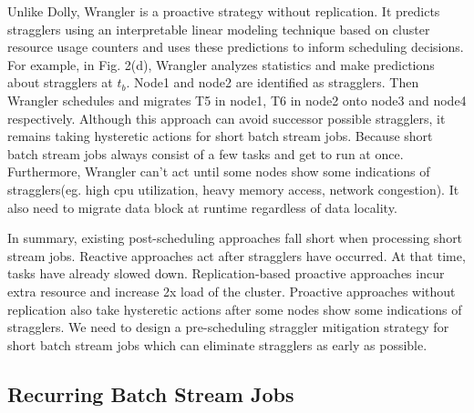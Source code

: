 \documentclass[10pt,conference,compsocconf,letterpaper]{IEEEtran}
\begin{document}
  Unlike Dolly, Wrangler \cite{Yadwadkar2014} is a proactive strategy without replication. It predicts stragglers using an interpretable linear modeling technique based on cluster resource usage counters and uses these predictions to inform scheduling decisions. For example, in Fig. 2(d), Wrangler analyzes statistics and make predictions about stragglers at $t_b$. Node1 and node2 are identified as stragglers. Then Wrangler schedules and migrates T5 in node1, T6 in node2 onto node3 and node4 respectively. Although this approach can avoid successor possible stragglers, it remains taking hysteretic actions for short batch stream jobs. Because short batch stream jobs always consist of a few tasks and get to run at once. Furthermore, Wrangler can't act until some nodes show some indications of stragglers(eg. high cpu utilization, heavy memory access, network congestion). It also need to migrate data block at runtime regardless of data locality.

  In summary, existing post-scheduling approaches fall short when processing short stream jobs. Reactive approaches act after stragglers have occurred. At that time, tasks have already slowed down. Replication-based proactive approaches incur extra resource and increase 2x load of the cluster. Proactive approaches without replication also take hysteretic actions after some nodes show some indications of stragglers. We need to design a pre-scheduling straggler mitigation strategy for short batch stream jobs which can eliminate stragglers as early as possible.

\subsection{Recurring Batch Stream Jobs}
\end{document}
